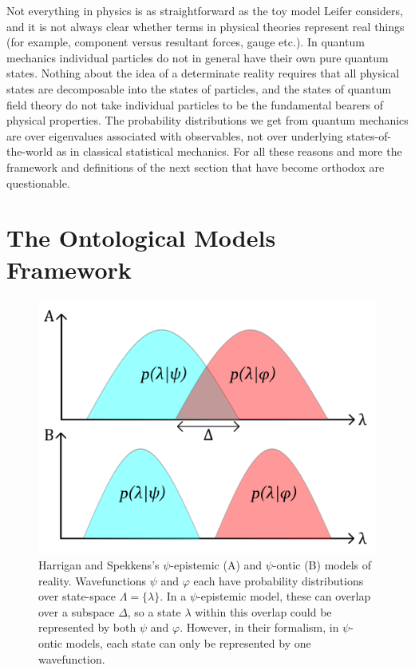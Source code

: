 \documentclass[superscriptaddress,reprint, floatfix, prl,nofootinbib]{revtex4-2}
\begin{document}
Not everything in physics is as straightforward as the toy model Leifer considers, and it is not always clear whether terms in physical theories represent real things (for example, component versus resultant forces, gauge etc.). In quantum mechanics individual particles do not in general have their own pure quantum states. Nothing about the idea of a determinate reality requires that all physical states are decomposable into the states of particles, and the states of quantum field theory do not take individual particles to be the fundamental bearers of physical properties. The probability distributions we get from quantum mechanics are over eigenvalues associated with observables, not over underlying states-of-the-world as in classical statistical mechanics. For all these reasons and more the framework and definitions of the next section that have become orthodox are questionable.

\section{The Ontological Models Framework}

\begin{figure}
    \centering
    \includegraphics[width=\linewidth]{StateOverlapDiag.pdf}
    \caption{Harrigan and Spekkens's $\psi$-epistemic (A) and $\psi$-ontic (B) models of reality. Wavefunctions $\psi$ and $\varphi$ each have probability distributions over state-space $\Lambda=\{\lambda\}$. In a $\psi$-epistemic model, these can overlap over a subspace \textit{$\Delta$}, so a state $\lambda$ within this overlap could be represented by both $\psi$ and $\varphi$. However, in their formalism, in $\psi$-ontic models, each state can only be represented by one wavefunction.}
    \label{fig:Graphs}
\end{figure}
\end{document}

